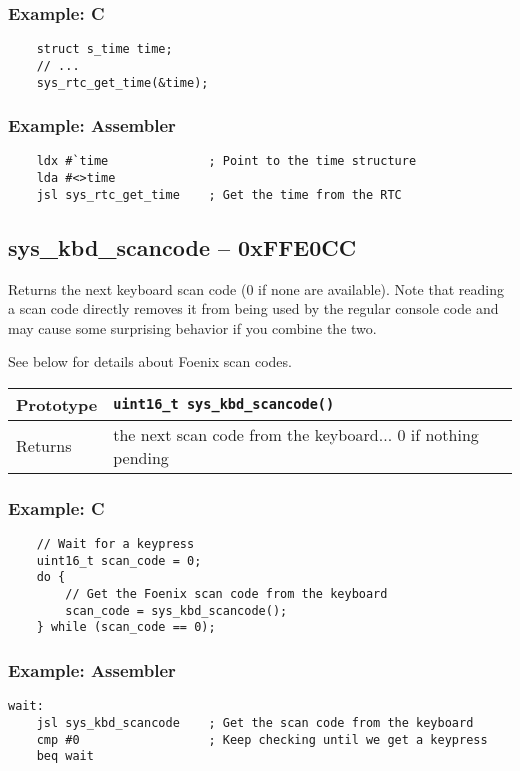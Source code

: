 \subsubsection*{Example: C}
\begin{lstlisting}
    struct s_time time;
    // ...
    sys_rtc_get_time(&time);
\end{lstlisting}

\subsubsection*{Example: Assembler}
\begin{verbatim}
    ldx #`time              ; Point to the time structure
    lda #<>time
    jsl sys_rtc_get_time    ; Get the time from the RTC
\end{verbatim}

\subsection*{sys\_kbd\_scancode -- 0xFFE0CC}
Returns the next keyboard scan code (0 if none are available). Note that reading a scan code directly removes it from being used by the regular console code and may cause some surprising behavior if you combine the two.

See below for details about Foenix scan codes.

\bigskip

\begin{tabular}{|l||l|} \hline
Prototype & \lstinline!uint16_t sys_kbd_scancode()! \\ \hline
Returns & the next scan code from the keyboard... 0 if nothing pending \\ \hline
\end{tabular}

\subsubsection*{Example: C}
\begin{lstlisting}
    // Wait for a keypress
    uint16_t scan_code = 0;
    do {
        // Get the Foenix scan code from the keyboard
        scan_code = sys_kbd_scancode();
    } while (scan_code == 0);
\end{lstlisting}

\subsubsection*{Example: Assembler}
\begin{verbatim}
wait:
    jsl sys_kbd_scancode    ; Get the scan code from the keyboard
    cmp #0                  ; Keep checking until we get a keypress
    beq wait
\end{verbatim}



